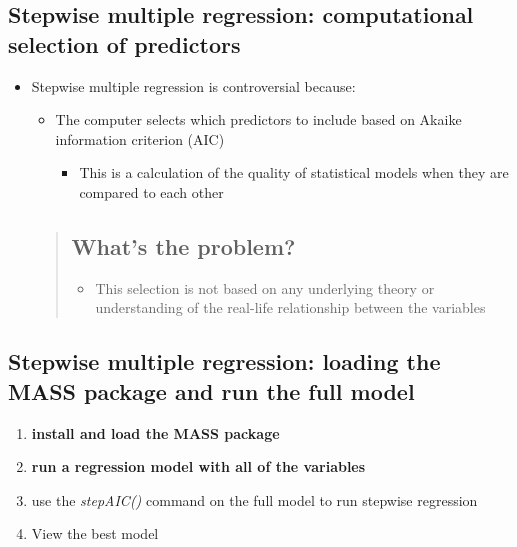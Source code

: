 \documentclass[
]{book}
\providecommand{\tightlist}{%
  \setlength{\itemsep}{0pt}\setlength{\parskip}{0pt}}
\begin{document}
\hypertarget{stepwise-multiple-regression-computational-selection-of-predictors}{%
\subsection{Stepwise multiple regression: computational selection of predictors}\label{stepwise-multiple-regression-computational-selection-of-predictors}}

\begin{itemize}
\tightlist
\item
  Stepwise multiple regression is controversial because:

  \begin{itemize}
  \tightlist
  \item
    The computer selects which predictors to include based on Akaike information criterion (AIC)

    \begin{itemize}
    \tightlist
    \item
      This is a calculation of the quality of statistical models when they are compared to each other
    \end{itemize}
  \end{itemize}

  \begin{quote}
  \hypertarget{whats-the-problem}{%
  \subsection{What's the problem?}\label{whats-the-problem}}

  \begin{itemize}
  \tightlist
  \item
    This selection is not based on any underlying theory or understanding of the real-life relationship between the variables
  \end{itemize}
  \end{quote}
\end{itemize}

\hypertarget{stepwise-multiple-regression-loading-the-mass-package-and-run-the-full-model}{%
\subsection{Stepwise multiple regression: loading the MASS package and run the full model}\label{stepwise-multiple-regression-loading-the-mass-package-and-run-the-full-model}}

\begin{enumerate}
\def\labelenumi{\arabic{enumi}.}
\tightlist
\item
  \textbf{install and load the MASS package}
\item
  \textbf{run a regression model with all of the variables}
\item
  use the \emph{stepAIC()} command on the full model to run stepwise regression
\item
  View the best model
\end{enumerate}
\end{document}
